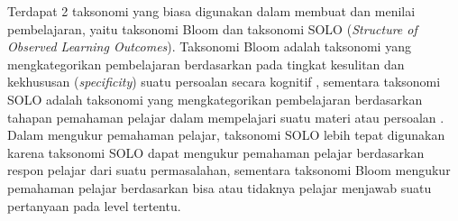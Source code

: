 Terdapat 2 taksonomi yang biasa digunakan dalam membuat dan menilai pembelajaran, yaitu taksonomi Bloom dan taksonomi SOLO (\textit{Structure of Observed Learning Outcomes}). Taksonomi Bloom adalah taksonomi yang mengkategorikan pembelajaran berdasarkan pada tingkat kesulitan dan kekhususan (\textit{specificity}) suatu persoalan secara kognitif \parencite{woolfolk2016educational}, sementara taksonomi SOLO adalah taksonomi yang mengkategorikan pembelajaran berdasarkan tahapan pemahaman pelajar dalam mempelajari suatu materi atau persoalan \parencite{biggs2014evaluating}. Dalam mengukur pemahaman pelajar, taksonomi SOLO lebih tepat digunakan karena taksonomi SOLO dapat mengukur pemahaman pelajar berdasarkan respon pelajar dari suatu permasalahan, sementara taksonomi Bloom mengukur pemahaman pelajar berdasarkan bisa atau tidaknya pelajar menjawab suatu pertanyaan pada level tertentu.


